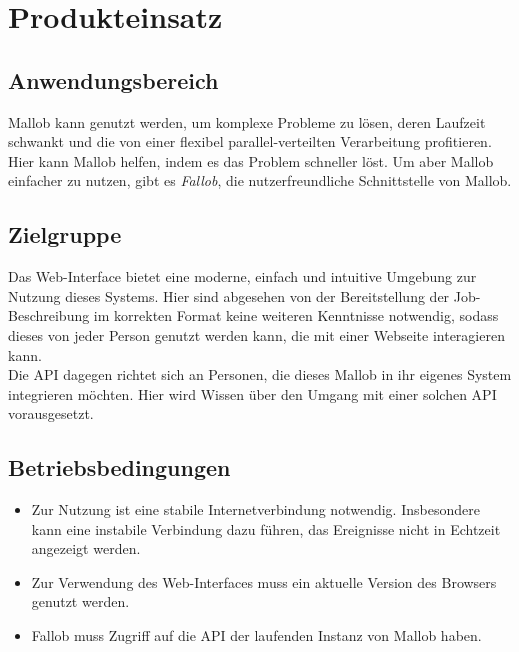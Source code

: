 \section{Produkteinsatz}

\subsection{Anwendungsbereich}

Mallob kann genutzt werden, um komplexe Probleme zu lösen, deren Laufzeit schwankt und die von einer flexibel parallel-verteilten Verarbeitung profitieren. Hier kann Mallob helfen, indem es das Problem schneller löst. Um aber Mallob einfacher zu nutzen, gibt es \textit{Fallob}, die nutzerfreundliche Schnittstelle von Mallob.

\subsection{Zielgruppe}

Das Web-Interface bietet eine moderne, einfach und intuitive Umgebung zur Nutzung dieses Systems. Hier sind abgesehen von der Bereitstellung der Job-Beschreibung im korrekten Format keine weiteren Kenntnisse notwendig, sodass dieses von jeder Person genutzt werden kann, die mit einer Webseite interagieren  kann.\\
Die API dagegen richtet sich an Personen, die dieses Mallob in ihr eigenes System integrieren möchten. Hier wird Wissen über den Umgang mit einer solchen API vorausgesetzt. 
\subsection{Betriebsbedingungen}

\begin{itemize}
    \item Zur Nutzung ist eine stabile Internetverbindung notwendig. Insbesondere kann eine instabile Verbindung dazu führen, das Ereignisse nicht in Echtzeit angezeigt werden.
    \item Zur Verwendung des Web-Interfaces muss ein aktuelle Version des Browsers genutzt werden.
    \item Fallob muss Zugriff auf die API der laufenden Instanz von Mallob haben.
\end{itemize}